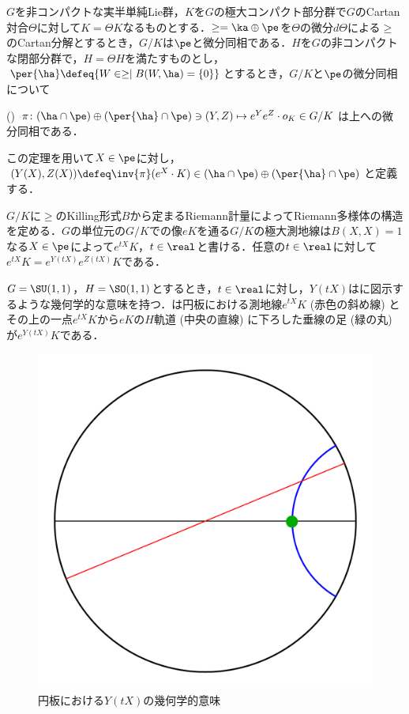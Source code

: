 $G$を非コンパクトな実半単純Lie群，$K$を$G$の極大コンパクト部分群で$G$のCartan対合$\Theta$に対して$K = \Theta K $なるものとする．$\ge = \ka \oplus \pe $を$\Theta$の微分$d\Theta$による$\ge$のCartan分解とするとき，$G/K$は$\pe$と微分同相である．$H$を$G$の非コンパクトな閉部分群で，$H = \Theta H$を満たすものとし，$\per{\ha}\defeq \{W\in \ge\mid B(W, \ha) = \{0\} \} $とするとき，$G/K$と$\pe$の微分同相について

\begin{thm*}(\cite[Lemma~6.1]{kob89})\label{thm:kob89-lem6.1}  
  $\pi\colon  (\ha\cap\pe)\oplus (\per{\ha}\cap \pe) \ni (Y, Z)\mapsto e^{Y}e^{Z}\cdot o_K \in G/K $は上への微分同相である．
\end{thm*}
この定理を用いて$X\in \pe$に対し，$(Y(X), Z(X))\defeq \inv{\pi}(e^X\cdot K)\in (\ha\cap\pe)\oplus (\per{\ha}\cap \pe)$と定義する．

$G/K$に$\ge$のKilling形式$B$から定まるRiemann計量によってRiemann多様体の構造を定める．$G$の単位元の$G/K$での像$eK$を通る$G/K$の極大測地線は$B(X, X) = 1 $なる$X\in \pe$によって$e^{tX}K $，$t\in \real$と書ける．任意の$t\in \real$に対して$e^{tX}K = e^{Y(tX)}e^{Z(tX)}K $である．

$G = \SU(1,1) $，$H = \SO(1,1) $とするとき，$t\in \real$に対し，$Y(tX) $はに図示するような幾何学的な意味を持つ．は{\Poincare}円板における測地線$e^{tX}K$ (赤色の斜め線) とその上の一点$e^{tX}K$から$eK$の$H$軌道 (中央の直線) に下ろした垂線の足 (緑の丸) が$e^{Y(tX)}K $である．
\begin{figure}[H]
  \centering
  \includegraphics[scale=0.3]{../graph/y-and-z.pdf}
  \caption{{\Poincare}円板における$Y(tX) $の幾何学的意味}
  \label{fig:y-and-z}
\end{figure}

